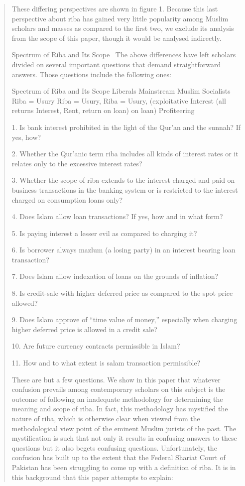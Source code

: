 \begin{quote}
These differing perspectives are shown in figure 1. Because this last perspective about riba has gained very little popularity among Muslim scholars and masses as compared to the first two, we exclude its analysis from the scope of this paper, though it would be analysed indirectly.

Spectrum of Riba and Its Scope
\
The above differences have left scholars divided on several important questions that demand straightforward answers. Those questions include the following ones:

Spectrum of Riba and Its Scope Liberals Mainstream Muslim Socialists Riba = Usury Riba = Usury, Riba = Usury, (exploitative Interest (all returns Interest, Rent, return on loan) on loan) Profiteering

1. Is bank interest prohibited in the light of the Qur'an and the sunnah? If yes, how?

2. Whether the Qur'anic term riba includes all kinds of interest rates or it relates only to the excessive interest rates?

3. Whether the scope of riba extends to the interest charged and paid on business transactions in the banking system or is restricted to the interest charged on consumption loans only?

4. Does Islam allow loan transactions? If yes, how and in what form?

5. Is paying interest a lesser evil as compared to charging it?

6. Is borrower always mazlum (a losing party) in an interest bearing loan transaction?

7. Does Islam allow indexation of loans on the grounds of inflation?

8. Is credit-sale with higher deferred price as compared to the spot price allowed?

9. Does Islam approve of “time value of money,” especially when charging higher deferred price is allowed in a credit sale?

10. Are future currency contracts permissible in Islam?

11. How and to what extent is salam transaction permissible?

These are but a few questions. We show in this paper that whatever confusion prevails among contemporary scholars on this subject is the outcome of following an inadequate methodology for determining the meaning and scope of riba. In fact, this methodology has mystified the nature of riba, which is otherwise clear when viewed from the methodological view point of the eminent Muslim jurists of the past. The mystification is such that not only it results in confusing answers to these questions but it also begets confusing questions. Unfortunately, the confusion has built up to the extent that the Federal Shariat Court of Pakistan has been struggling to come up with a definition of riba. It is in this background that this paper attempts to explain:


\end{quote}

